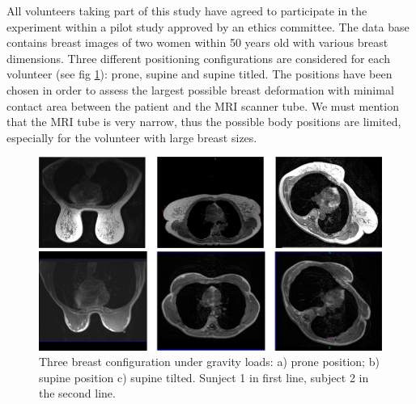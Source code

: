 All volunteers taking part of this study have agreed to participate in the experiment within a pilot study approved by an ethics committee. The data base contains breast images of two women within 50 years old with various breast dimensions. Three different positioning configurations are considered for each volunteer (see fig \ref{breastpositions}): prone, supine and supine titled. The positions have been chosen in order to assess the largest possible breast deformation with minimal contact area between the patient and the MRI scanner tube. We must mention that the MRI tube is very narrow, thus the possible body positions are limited, especially for the volunteer with large breast sizes.  

\begin{center}
\begin{figure}[H]
\centerline{\includegraphics[width=\textwidth,height=\textheight,keepaspectratio]{figures/breastpositions.png} }
\vspace{15px}
\centerline{\includegraphics[width=\textwidth,height=\textheight,keepaspectratio]{figures/subject2.png} }
\caption{Three breast configuration under gravity loads: a) prone position; b) supine position c) supine tilted. Sunject 1 in first line, subject 2 in the second line.}
\label{breastpositions}
\end{figure}
\end{center}

